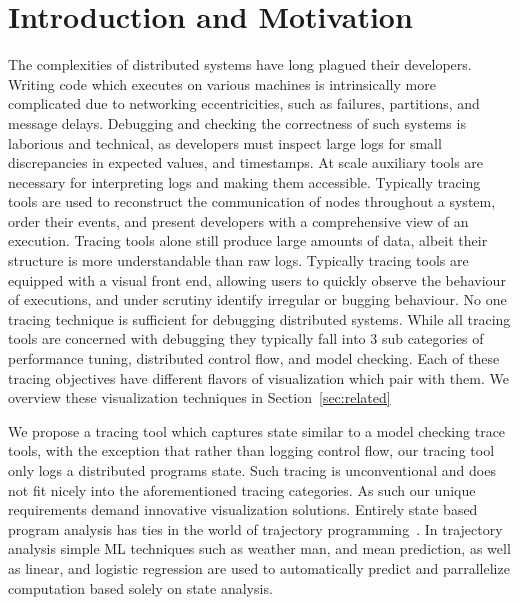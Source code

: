 \section{Introduction and Motivation}
\label{sec:intro}


The complexities of distributed systems have long plagued their
developers. Writing code which executes on various machines is
intrinsically more complicated due to networking eccentricities, such
as failures, partitions, and message delays. Debugging and checking
the correctness of such systems is laborious and technical, as
developers must inspect large logs for small discrepancies in expected
values, and timestamps. At scale auxiliary tools are necessary for
interpreting logs and making them accessible. Typically tracing tools
are used to reconstruct the communication of nodes throughout a
system, order their events, and present developers with a
comprehensive view of an execution.
    Tracing tools alone still produce large amounts of data, albeit
    their structure is more understandable than raw logs. Typically
    tracing tools are equipped with a visual front end, allowing users
    to quickly observe the behaviour of executions, and under scrutiny
    identify irregular or bugging behaviour. No one tracing technique
    is sufficient for debugging distributed systems. While all tracing
    tools are concerned with debugging they typically fall into 3 sub
    categories of performance tuning, distributed control flow, and
    model checking. Each of these tracing objectives have different
    flavors of visualization which pair with them. We overview these
    visualization techniques in Section~\ref{sec:related}

We propose a tracing tool which captures state similar to a model
checking trace tools, with the exception that rather than logging
control flow, our tracing tool only logs a distributed programs state.
Such tracing is unconventional and does not fit nicely into the
aforementioned tracing categories. As such our unique requirements
demand innovative visualization solutions. Entirely state based program
analysis has ties in the world of trajectory
programming~\cite{Waterland:2014:AAS:2654822.2541985,181250,Waterland:2013:CC:2485732.2485749}.
In trajectory analysis simple ML techniques such as weather man, and
mean prediction, as well as linear, and logistic regression are used
to automatically predict and parrallelize computation based solely on
state analysis.

